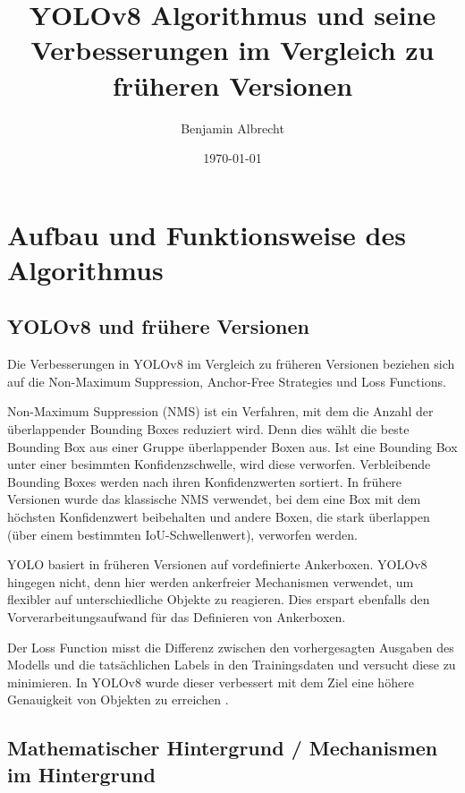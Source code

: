 \documentclass[a4paper,12pt]{article}
\title{YOLOv8 Algorithmus und seine Verbesserungen im Vergleich zu früheren Versionen}
\author{Benjamin Albrecht}
\date{\today}
\begin{document}
\sloppy
\maketitle
\tableofcontents

\section{Aufbau und Funktionsweise des Algorithmus}
\subsection{YOLOv8 und frühere Versionen}
Die Verbesserungen in YOLOv8 im Vergleich zu früheren Versionen beziehen sich auf die Non-Maximum Suppression, Anchor-Free Strategies und Loss Functions.\par\vspace{0.5em}

\noindent Non-Maximum Suppression (NMS) ist ein Verfahren, mit dem die Anzahl der überlappender Bounding Boxes reduziert wird. Denn dies wählt die beste Bounding Box aus einer Gruppe überlappender Boxen aus. Ist eine Bounding Box unter einer besimmten Konfidenzschwelle, wird diese verworfen. Verbleibende Bounding Boxes werden nach ihren Konfidenzwerten sortiert. In frühere Versionen wurde das klassische NMS verwendet, bei dem eine Box mit dem höchsten Konfidenzwert beibehalten und andere Boxen, die stark überlappen (über einem bestimmten IoU-Schwellenwert), verworfen werden.\par\vspace{0.5em}

\noindent YOLO basiert in früheren Versionen auf vordefinierte Ankerboxen. YOLOv8 hingegen nicht, denn hier werden ankerfreier Mechanismen verwendet, um flexibler auf unterschiedliche Objekte zu reagieren. Dies erspart ebenfalls den Vorverarbeitungsaufwand für das Definieren von Ankerboxen.\par\vspace{0.5em}
\noindent Der Loss Function misst die Differenz zwischen den vorhergesagten Ausgaben des Modells und die tatsächlichen Labels in den Trainingsdaten und versucht diese zu minimieren. In YOLOv8 wurde dieser verbessert mit dem Ziel eine höhere Genauigkeit von Objekten zu erreichen \cite{terven2023comprehensive, reis2023real, safaldin2024improved}.\par\vspace{0.5em}


\subsection{Mathematischer Hintergrund / Mechanismen im Hintergrund}
\end{document}
